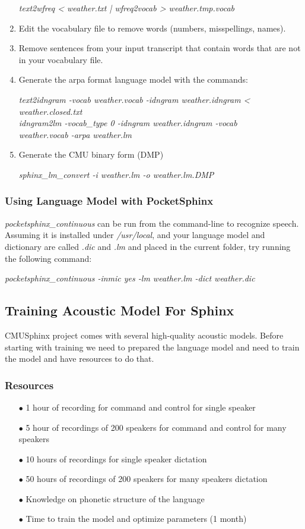 \documentclass[12pt,a4paper,oneside]{memoir}
\begin{document}
\begin{enumerate}
	\textit{text2wfreq < weather.txt | wfreq2vocab > weather.tmp.vocab} 
  \item Edit the vocabulary file to remove words (numbers, misspellings, names).
  \item Remove sentences from your input transcript that contain words that are not in your vocabulary file.
  \item Generate the arpa format language model with the commands:

	 \textit{text2idngram -vocab weather.vocab -idngram weather.idngram < weather.closed.txt \\
	 idngram2lm -vocab\_type 0 -idngram weather.idngram -vocab \ \\
     	 weather.vocab -arpa weather.lm}
  \item Generate the CMU binary form (DMP) 

	\textit{sphinx\_lm\_convert -i weather.lm -o weather.lm.DMP}
\end{enumerate}

\subsubsection{Using Language Model with PocketSphinx}

\textit{pocketsphinx\_continuous} can be run from the command-line to recognize speech. Assuming it is installed under \textit{/usr/local}, and your language model and dictionary are called \textit{.dic} and \textit{.lm} and placed in the current folder, try running the following command: 

\textit{pocketsphinx\_continuous -inmic yes -lm weather.lm -dict weather.dic}


\subsection{Training Acoustic Model For Sphinx}
CMUSphinx project comes with several high-quality acoustic models. Before starting with training we need to prepared the language model and  need to train the model and have resources to do that.

\subsubsection{Resources}
\begin{itemize}
 \item[$\bullet$] 1 hour of recording for command and control for single speaker
 \item[$\bullet$] 5 hour of recordings of 200 speakers for command and control for many speakers
 \item[$\bullet$] 10 hours of recordings for single speaker dictation
 \item[$\bullet$] 50 hours of recordings of 200 speakers for many speakers dictation
 \item[$\bullet$] Knowledge on phonetic structure of the language
 \item[$\bullet$] Time to train the model and optimize parameters (1 month)
\end{itemize}
\end{document}

